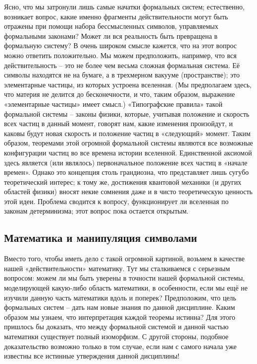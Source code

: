 \documentclass[../main.tex]{subfiles}
\begin{document}
Ясно, что мы затронули лишь самые начатки формальных систем; естественно, возникает вопрос, какие именно фрагменты действительности могут быть отражены при помощи набора бессмысленных символов, управляемых формальными законами? Может ли вся реальность быть превращена в формальную систему? В очень широком смысле кажется, что на этот вопрос можно ответить положительно. Мы можем предположить, например, что вся действительность \--- это не более чем весьма сложная формальная система. Её символы находятся не на бумаге, а в трехмерном вакууме (пространстве); это элементарные частицы, из которых устроена вселенная. (Мы предполагаем здесь, что материя не делится до бесконечности, и что, таким образом, выражение «элементарные частицы» имеет смысл.) «Типографские правила» такой формальной системы \--- законы физики, которые, учитывая положение и скорость всех частиц в данный момент, говорят нам, какие изменения произойдут, и каковы будут новая скорость и положение частиц в «следующий» момент. Таким образом, теоремами этой огромной формальной системы являются все возможные конфигурации частиц во все времена истории вселенной. Единственной аксиомой здесь является (или являлось) первоначальное положение всех частиц в «начале времен». Однако это концепция столь грандиозна, что представляет лишь сугубо теоретический интерес; к тому же, достижения квантовой механики (и других областей физики) вносят некие сомнения даже и в чисто теоретическую ценность этой идеи. Проблема сводится к вопросу, функционирует ли вселенная по законам детерминизма; этот вопрос пока остается открытым.


\subsection{Математика и манипуляция символами}

Вместо того, чтобы иметь дело с такой огромной картиной, возьмем в качестве нашей «действительности» математику. Тут мы сталкиваемся с серьезным вопросом: можем ли мы быть уверены в точности нашей формальной системы, моделирующей какую-либо область математики, в особенности, если мы ещё не изучили данную часть математики вдоль и поперек? Предположим, что цель формальных систем \--- дать нам новые знания по данной дисциплине. Каким образом мы узнаем, что интерпретация каждой теоремы истинна? Для этого пришлось бы доказать, что между формальной системой и данной частью математики существует полный изоморфизм. С другой стороны, подобное доказательство возможно только в том случае, если нам с самого начала уже известны все истинные утверждения данной дисциплины!
\end{document}
